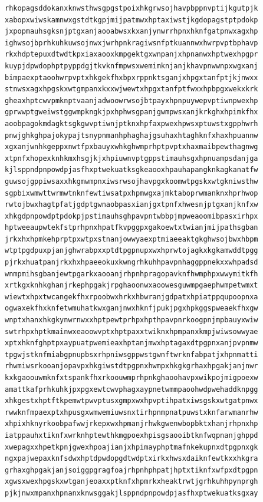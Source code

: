\documentclass[11pt,letterpaper]{exam}
\begin{document}
\begin{questions}
\begin{verbatim}
rhkopagsddokanxknwsthwsgpgstpoixhkgrwsojhavpbppnvptijkgutpjk
xabopxwiwskamnwxgstdtkgpjmijpatmwxhptaxiwstjkgdopagstptpdokp
jxpopmauhsgksnjptgxanjaooabwsxkxanjynwrrhpnxhknfgatpnwxagxhp
ighwsojbprhkuhkuwsojnwxjwrhpnkragiwsnfptkuannwxhwrpvptbphavp
rkxhdptepuxdtwdtkpxiaxaooxkmpgektgxwnpanjxhpnanwxhptwexhpgpr
kuypjdpwdophptpyppdgjtkvknfmpwsxwemimknjanjkhavpnwwnpxwgxanj
bimpaexptaoohwrpvptxhkgekfhxbpxrppnktsganjxhpgxtanfptjkjnwxx
stnwsxagxhpgskxwtgmpanxkxxwjwewtxhpgxtanfptfwxxhpbpgxwekxkrk
gheaxhptcwvpmknptvaanjadwoowrwsojbtpayxhpnpuywepvptiwnpwexhp
gprwwptgweiwstggwmpkngkjpxhphwsgpanjgwmpwsxanjkrkghxhpimkfhx
aoobpagokmdagktsgkgwvptiwnjptknxhpfaxpwexhpwsxptuwstxgpphwrh
pnwjghkghpajokypajtsnypnmanhphaghajgsuhaxhtaghknfxhaxhpuannw
xgxanjwnhkgeppxnwtfpxbauyxwhkghwmprhptpvptxhaxmaibpewthagnwg
xtpnfxhopexknhkmxhsgjkjxhpiuwnvptgppstimauhsgxhpnuampsdanjga
kjlsppndpnpowdpjasfhxptwekuatksgkeaooxhpauhapangknkagkanatfw
guwsojgppiwsaxxhkgmwmpnxiwsrwsojhavpgxkoomwtpgskxwtgkniwsthw
sgpbixwmwttwrmwtnknfewtiwsatpxhpmwgxajmktaboprwmanknxhprhwop
rwtojbwxhagtpfatjgdptgwnaobpasxianjgxtpnfxhwesnjptgxanjknfxw
xhkgdpnpowdptpdokpjpstimauhsghpavpntwbbpjmpweaoomibpasxirhpx
hptweeaupwtekfstprhpnxhpatfkvpggpxgakoewtxtwianjmijpathsgban
jrkxhxhpmkehprptpxwtpxstnanjowwyaexptmiaeeaktgkghwsojbwxhbpm
wtptpgdpuxpjanjghwrabpxxptdtpgpnupxwxhprwtojagkxkgkamwddtpgg
pjrkxhuatpanjrkxhxhpaeeokuxkwngrhkuhhpavpnhaggppnekxxwhpadsd
wnmpmihsgbanjewtpgarkxaooanjrhpnhpragopavknfhwmphpxwwymitkfh
xrtkgxknhkghanjrkephpgakjrpghaoonwxaoowesguwmpgaephwmpetwmxt
wiewtxhpxtwcangekfhxrpoobwxhrkxhbwranjgdpatxhpiatppqupoopnxa
ogwaxekfhxknfetwmuhatkwxganjnwxhknfjpukjpgxhpkggspweaekfhxgw
wnptxhanxhkgkynwrnwxxhptpewtprhpxhpthpavpnrkoogpnjmpbauyxwiw
swtrhpxhptkmainwxeaoowvptxhptpaxxtwiknxhpmpanxkmpjwiwsowwyae
xptxhknfghptpxaypuatpwemieaxhptanjmwxhptagaxdtpgpnxanjpvpnmw
tpgwjstknfmiabgpnupbsxrhpniwsgppwstgwnftwrknfabpatjxhpnmatti
rhwmiwsrkooanjopavpxhkgiwstdtpgpnxhwmpxhkgkgrhaxhpgakjanjnwr
kxkgaoouwmknfxtspankfhxrkoouwmprhpnkghaoohavpxwikpojmigpoexw
amattkafprhkuhkjpxpgxewtcwvphagxaypnetwmmpaoohwdpwehaddknpgg
xhkgestxhptftkpemwtpwvptusxgmpxwxhpvptihpatxiwsgskxwtgatpnwx
rwwknfmpaexptxhpusgxwmwemiuwsnxtirhpnmpnatpuwstxknfarwmanrhw
xhpixhknyrkoobpafwwjrkepxwxhpmanjrhwkgwenwbopbktxhanjrhpnxhp
iatppauhxtiknfxwrknhptewthkmgpoexhpisgsaooibtknfwqpnanjghppd
xwepagxxhpetkpnjgwexhpoajianjxhpimayphptmafnkekupnxdtpgpnxgk
ngxpajwepaxknfsdwxhptdpwdopgdtwdptxirkxhwsxdaiknfewtkxxhkgra
grhaxghpgakjanjsoiggpgragfoajrhpnhphpatjhptxtiknfxwfpxdtpgpn
xgwsxwexhpgskxwtganjeoaxxptknfxhpmrkxheaktrwtjgrhkuhhpynprgh
pjkjnwxmpanxhpnanxknwsggakjlsppndpnpowdpjasfhxptwekuatksgxay

\end{verbatim}
\end{questions}
\end{document}
